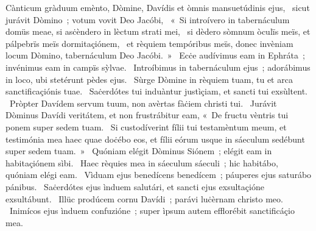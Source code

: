 { Cànticum gràduum}
{%
emènto, Dòmine, Davídis et òmnis mansuetúdinis ejus, 
~sicut jurávit Dòmino~; votum vovit Deo Jacóbi, 
~«~Si introívero in tabernáculum domüs meae, si asċèndero in lèctum strati mei, 
~si dèdero sòmnum òculïs meïs, et pálpebrïs meïs dormitaçiónem, 
~et rèquiem tempóribus meïs, donec invèniam locum Dòmino, tabernáculum Deo Jacóbi.~»
~Ecċe audívimus eam in Ephráta~; invénimus eam in campïs sỳlvae. 
~Introíbimus in tabernáculum ejus~; adorábimus in loco, ubi stetérunt pèdes ejus. 
~Sùrge Dòmine in rèquiem tuam, tu et arca sanctificaçiónis tuae. 
~Saċerdótes tui induàntur justìçiam, et sancti tui exsùltent. 
~Pròpter Davídem servum tuum, non avèrtas fàċiem christi tui. 
~Jurávit Dòminus Davídi veritátem, et non frustrábitur eam, «~De fructu vèntris tui ponem super sedem tuam. 
~Si custodíverint fílii tui testamèntum meum, et testimónia mea haec quae doċébo eos, et fílii eórum usque in sáeculum sedébunt super sedem tuam.~»
~Quóniam elégit Dòminus Siónem~; elégit eam in habitaçiónem sìbi. 
~Haec rèquies mea in sáeculum sáeculi~; hic habitábo, quóniam elégi eam. 
~Vìduam ejus benedícens benedícem~; páuperes ejus saturábo pánibus. 
~Saċerdótes ejus ìnduem salutári, et sancti ejus exsultaçióne exsultábunt. 
~Illüc prodúcem cornu Davídi~; parávi luċèrnam christo meo. 
~Inimícos ejus ìnduem confuzióne~; super ìpsum autem efflorébit sanctificáçio mea. 
}
